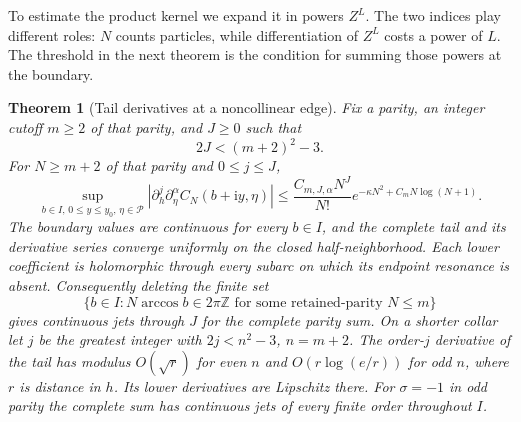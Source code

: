 \documentclass[11pt]{article}
\numberwithin{equation}{section}
\newtheorem{theorem}{Theorem}[section]
\theoremstyle{definition}
\newcommand{\ii}{\mathrm i}
\begin{document}
To estimate the product kernel we expand it in powers $Z^L$.
The two indices play different roles: $N$ counts particles, while
differentiation of $Z^L$ costs a power of $L$. The threshold in the next
theorem is the condition for summing those powers at the boundary.

\begin{theorem}[Tail derivatives at a noncollinear edge]
\label{edge:new:budget}
Fix a parity, an integer cutoff $m\ge2$ of that parity, and $J\ge0$
such that
\[
                         2J<(m+2)^2-3.
\]
For $N\ge m+2$ of that parity and $0\le j\le J$,
\[
 \sup_{b\in I,\,0\le y\le y_0,\,\eta\in\mathcal P}
 |\partial_h^j\partial_\eta^\alpha C_N(b+\ii y,\eta)|
 \le\frac{C_{m,J,\alpha}N^J}{N!}
       e^{-\kappa N^2+C_mN\log(N+1)}.
\]
The boundary values are continuous for every $b\in I$, and the complete
tail and its derivative series converge uniformly on the closed
half-neighborhood. Each lower coefficient is
holomorphic through every subarc on which its endpoint resonance is
absent.  Consequently deleting the finite set
\[
 \{b\in I:N\arccos b\in2\pi\mathbb Z
             \text{ for some retained-parity }N\le m\}
\]
gives continuous jets through $J$ for the complete parity sum.
On a shorter collar let $j$ be the greatest integer with
$2j<n^2-3$, $n=m+2$. The order-$j$ derivative of the tail has modulus $O(\sqrt r)$ for even $n$
and $O(r\log(e/r))$ for odd $n$, where $r$ is distance in $h$.
Its lower derivatives are Lipschitz there. For $\sigma=-1$ in odd
parity the complete sum has continuous jets of every finite order
throughout $I$.
\end{theorem}
\end{document}
